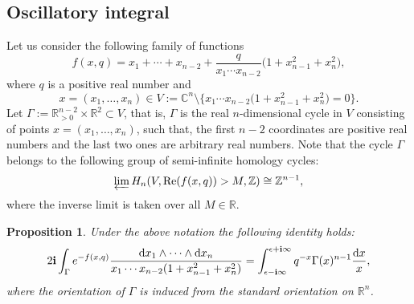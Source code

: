 \documentclass[pdftex]{sigma}
\numberwithin{equation}{section}
\newtheorem{Proposition}[Theorem]{Proposition}
\newcommand{\CC}{\mathbb{C}}
\newcommand{\ZZ}{\mathbb{Z}}
\newcommand{\RR}{\mathbb{R}}
\newcommand{\ii}{\mathbf{i}}
\begin{document}
\subsection{Oscillatory integral}

Let us consider the following family of functions
\[
f(x,q)=x_1+\cdots + x_{n-2} +
\frac{q}{ x_1\cdots x_{n-2}} \big(1+x_{n-1}^2+x_n^2\big),
\]
where $q$ is a positive real number and
\[
x=(x_1,\dots, x_n)\in V:=\CC^n\setminus{\big\{
x_1\cdots x_{n-2} \big(1+x_{n-1}^2+x_n^2\big)= 0\big\} }.
\]
Let $\Gamma:=\RR^{n-2}_{>0}\times \RR^2 \subset V$, that is, $\Gamma$
is the real $n$-dimensional cycle in $V$ consisting of points $x=(x_1,\dots,x_n)$,
such that, the first $n-2$ coordinates are positive real numbers and
the last two ones are arbitrary real numbers. Note that the cycle
$\Gamma$ belongs to the following group of
semi-infinite homology cycles:
\[
\varprojlim H_n (V, \operatorname{Re}(f(x,q))>M,\ZZ)\cong \ZZ^{n-1},
\]
where the inverse limit is taken over all $M\in \RR$.
\begin{Proposition}\label{prop:oscil_int}
Under the above notation the following identity holds:
\[
2\ii
\int_{\Gamma} e^{-f(x,q)}
\frac{{\rm d}x_1\wedge \cdots \wedge {\rm d}x_n}{
x_1\cdots x_{n-2} (1+x_{n-1}^2+x_n^2) } =
\int_{\epsilon-\ii\infty}^{\epsilon+\ii\infty}
q^{-x} \Gamma(x)^{n-1} \frac{{\rm d}x}{x},
\]
where the orientation of $\Gamma$ is induced from the standard
orientation on $\RR^n$.
\end{Proposition}
\end{document}
